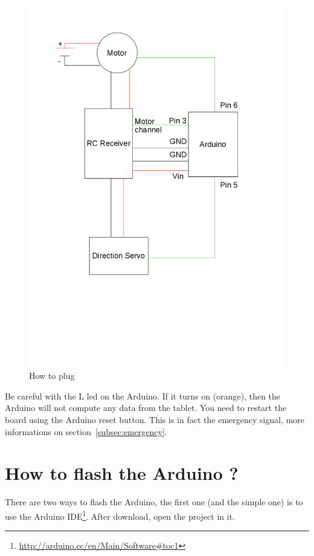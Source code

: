 \documentclass[a4paper,11pt]{report}
\begin{document}
\begin{figure}[!ht]
\centering
\includegraphics[scale=0.5]{img_static/wires}
\caption{How to plug}
\label{fig:wires}
\end{figure}

Be careful with the L led on the Arduino. If it turns on (orange), then the
Arduino will not compute any data from the tablet. You need to restart the
board using the Arduino reset button. This is in fact the emergency signal,
more informations on section~\ref{subsec:emergency}.

\section{How to flash the Arduino ?}

There are two ways to flash the Arduino, the first one (and the simple one) is
to use the Arduino
IDE\footnote{\url{http://arduino.cc/en/Main/Software\#toc1}}. After download,
open the project in it.
\end{document}
